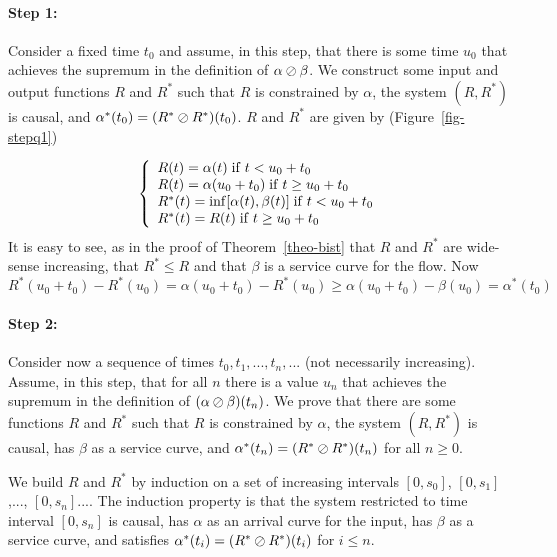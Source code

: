 \paragraph{Step 1:} Consider a fixed time $t_0$ and assume, in this
step, that there is some time $u_0$ that achieves the supremum in
the definition of $\alpha \oslash \beta$. We construct some input and
output functions $R$ and $R^*$ such that $R$ is constrained by
$\alpha$, the system $(R, R^*)$ is causal, and $\alpha^*(t_0) =
(R^*\oslash R^*)(t_0)$. $R$ and $R^*$ are given by
(Figure~\ref{fig-stepq1})
\begin{figure}[htbp]
\end{figure}
$$
\left\{\begin{array}{l}  R(t)=\alpha(t) \mathrm{\; if \; } t < u_0 + t_0\\
 R(t)=\alpha(u_0 + t_0) \mathrm{\; if \; } t \geq u_0 + t_0 \\
 R^*(t)=\inf[\alpha(t),\beta(t)] \mathrm{\; if \; } t < u_0 + t_0  \\
 R^*(t)=R(t) \mathrm{\; if \; } t \geq u_0 + t_0
  \end{array} \right.
$$
It is easy to see, as in the proof of Theorem~\ref{theo-bist} that
$R$ and $R^*$ are wide-sense increasing, that $R^* \leq R$ and
that $\beta$ is a service curve for the flow. Now
 $$
 R^*(u_0+t_0)-R^*(u_0)=\alpha(u_0+t_0)-R^*(u_0)
  \geq \alpha(u_0+t_0)-\beta(u_0) = \alpha^*(t_0)
 $$

\paragraph{Step 2:} Consider now a sequence of times
$t_0, t_1, ..., t_n, ...$ (not necessarily increasing). Assume, in
this step, that for all $n$ there is a value $u_n$ that achieves
the supremum in the definition of $(\alpha \oslash \beta)(t_n)$. We
prove that there are some functions $R$ and $R^*$ such that $R$ is
constrained by $\alpha$, the system $(R, R^*)$ is causal, has
$\beta$ as a service curve, and $\alpha^*(t_n) = (R^*\oslash
R^*)(t_n)$ for all $n \geq 0$.

We build $R$ and $R^*$ by induction on a set of increasing
intervals $[0,s_0]$,  $[0,s_1]$,..., $[0,s_n] ...$. The induction
property is that the system restricted to time interval $[0,s_n]$
is causal, has $\alpha$ as an arrival curve for the input, has
$\beta$ as a service curve, and satisfies $\alpha^*(t_i) =
(R^*\oslash R^*)(t_i)$ for $i \leq n$.

